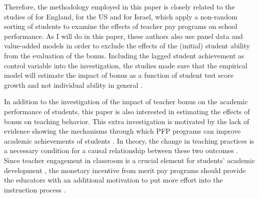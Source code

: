 \documentclass[a4paper, 12pt]{article}
\begin{document}


Therefore, the methodology employed in this paper is closely related to the studies of \citet{britton2016teacher} for England, \citet{imberman2015incentive} for the US and \citet{lavy2009performance} for Israel, which apply a non-random sorting of students to examine the effects of teacher pay programs on school performance. As I will do in this paper, these authors also use panel data and value-added models in order to exclude the effects of the (initial) student ability from the evaluation of the bonus. Including the lagged student achievement as control variable into the investigation, the studies made sure that the empirical model will estimate the impact of bonus as a function of student test score growth and not individual ability in general \citep{hanushek2012distribution}.



In addition to the investigation of the impact of teacher bonus on the academic performance of students, this paper is also interested in estimating the effects of bonus on teaching behavior. This extra investigation is motivated by the lack of evidence showing the mechanisms through which PFP programs can improve academic achievements of students \citep{nyberg2018collective, hanushek2011overview}. In theory, the change in teaching practices is a necessary condition for a causal relationship between these two outcomes \citep{jones2013teacher}. Since teacher engagement in classroom is a crucial element for students’ academic development \citep{woessmann2011cross}, the monetary incentive from merit pay programs should provide the educators with an additional motivation to put more effort into the instruction process \citep{gneezy2011and}. 

\end{document}
